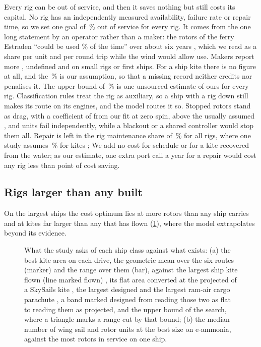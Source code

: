 Every rig can be out of service, and then it saves nothing but still costs its capital. No rig has an independently measured availability, failure rate or repair time, so we set one goal of \,\% out of service for every rig. It comes from the one long statement by an operator rather than a maker: the rotors of the ferry Estraden ``could be used \% of the time'' over about six years \citep{spliethoff2021}, which we read as a share per unit and per round trip while the wind would allow use. Makers report more \citep{kuuskoski2018,anemoi2026,oceanwings2025}, undefined and on small rigs or first ships. For a ship kite there is no figure at all, and the \,\% is our assumption, so that a missing record neither credits nor penalises it. The upper bound of \,\% is one unsourced estimate of ours for every rig. Classification rules treat the rig as auxiliary, so a ship with a rig down still makes its route on its engines, and the model routes it so. Stopped rotors stand as drag, with a coefficient of  from our fit at zero spin, above the  usually assumed \citep{rechevilanova2021}, and units fail independently, while a blackout or a shared controller would stop them all. Repair is left in the rig maintenance share of \,\% for all rigs, where one study assumes \,\% for kites \citep{emsa2023};  We add no cost for schedule or for a kite recovered from the water; as our estimate, one extra port call a year for a repair would cost any rig less than  point of cost saving.

\subsection{Rigs larger than any built}
\label{sec:disc_size}

On the largest ships the cost optimum lies at more rotors than any ship carries and at kites far larger than any that has flown (\cref{fig:large_rigs}), where the model extrapolates beyond its evidence.

\begin{figure}[tbp]
\centering
{}
\caption{What the study asks of each ship class against what exists: (a) the best kite area on each drive, the geometric mean over the six routes (marker) and the range over them (bar), against the largest ship kite flown (line marked flown) \citep{fritz2013}, its flat area converted at the  projected of a  SkySails kite \citep{folkersma2020}, the largest designed \citep{airseas_seawing_web} and the largest ram-air cargo parachute \citep{dunker2013}, a band marked designed from reading those two as flat to reading them as projected, and the upper bound of the search, where a triangle marks a range cut by that bound; (b) the median number of wing sail and rotor units at the best size on e-ammonia, against the most rotors in service on one ship.}
\label{fig:large_rigs}
\end{figure}

